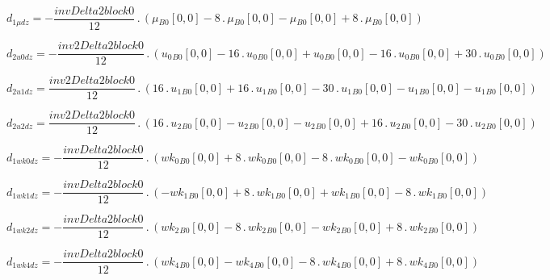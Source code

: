 \documentclass{article}
\begin{document}
\begin{dmath}d_{1 \mu dz} = - \frac{invDelta2block0}{12} \,.\, \left({\mu{_{B0}}}[{0,0}] - 8 \,.\, {\mu{_{B0}}}[{0,0}] - {\mu{_{B0}}}[{0,0}] + 8 \,.\, {\mu{_{B0}}}[{0,0}]\right)\end{dmath}

\begin{dmath}d_{2 u0 dz} = - \frac{inv2Delta2block0}{12} \,.\, \left({u_{0}{_{B0}}}[{0,0}] - 16 \,.\, {u_{0}{_{B0}}}[{0,0}] + {u_{0}{_{B0}}}[{0,0}] - 16 \,.\, {u_{0}{_{B0}}}[{0,0}] + 30 \,.\, {u_{0}{_{B0}}}[{0,0}]\right)\end{dmath}

\begin{dmath}d_{2 u1 dz} = \frac{inv2Delta2block0}{12} \,.\, \left(16 \,.\, {u_{1}{_{B0}}}[{0,0}] + 16 \,.\, {u_{1}{_{B0}}}[{0,0}] - 30 \,.\, {u_{1}{_{B0}}}[{0,0}] - {u_{1}{_{B0}}}[{0,0}] - {u_{1}{_{B0}}}[{0,0}]\right)\end{dmath}

\begin{dmath}d_{2 u2 dz} = \frac{inv2Delta2block0}{12} \,.\, \left(16 \,.\, {u_{2}{_{B0}}}[{0,0}] - {u_{2}{_{B0}}}[{0,0}] - {u_{2}{_{B0}}}[{0,0}] + 16 \,.\, {u_{2}{_{B0}}}[{0,0}] - 30 \,.\, {u_{2}{_{B0}}}[{0,0}]\right)\end{dmath}

\begin{dmath}d_{1 wk0 dz} = - \frac{invDelta2block0}{12} \,.\, \left({wk_{0}{_{B0}}}[{0,0}] + 8 \,.\, {wk_{0}{_{B0}}}[{0,0}] - 8 \,.\, {wk_{0}{_{B0}}}[{0,0}] - {wk_{0}{_{B0}}}[{0,0}]\right)\end{dmath}

\begin{dmath}d_{1 wk1 dz} = - \frac{invDelta2block0}{12} \,.\, \left(- {wk_{1}{_{B0}}}[{0,0}] + 8 \,.\, {wk_{1}{_{B0}}}[{0,0}] + {wk_{1}{_{B0}}}[{0,0}] - 8 \,.\, {wk_{1}{_{B0}}}[{0,0}]\right)\end{dmath}

\begin{dmath}d_{1 wk2 dz} = - \frac{invDelta2block0}{12} \,.\, \left({wk_{2}{_{B0}}}[{0,0}] - 8 \,.\, {wk_{2}{_{B0}}}[{0,0}] - {wk_{2}{_{B0}}}[{0,0}] + 8 \,.\, {wk_{2}{_{B0}}}[{0,0}]\right)\end{dmath}

\begin{dmath}d_{1 wk4 dz} = - \frac{invDelta2block0}{12} \,.\, \left({wk_{4}{_{B0}}}[{0,0}] - {wk_{4}{_{B0}}}[{0,0}] - 8 \,.\, {wk_{4}{_{B0}}}[{0,0}] + 8 \,.\, {wk_{4}{_{B0}}}[{0,0}]\right)\end{dmath}
\end{document}
